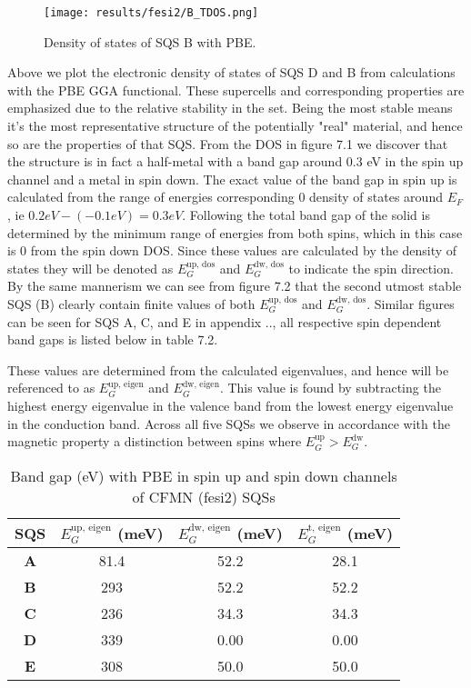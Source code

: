 \begin{figure}[H]
\centering
	\texttt{[image: results/fesi2/B\_TDOS.png]}
	\caption{Density of states of SQS B  with PBE.}
\end{figure}  

Above we plot the electronic density of states of SQS D and B from calculations with the PBE GGA functional. These supercells and corresponding properties are emphasized due to the relative stability in the set. Being the most stable means it's the most representative structure of the potentially "real" material, and hence so are the properties of that SQS. From the DOS in figure 7.1 we discover that the structure is in fact a half-metal with a band gap around 0.3 eV in the spin up channel and a metal in spin down. The exact value of the band gap in spin up is calculated from the range of energies corresponding 0 density of states around $E_F$, ie $ 0.2 eV - (-0.1 eV) = 0.3 eV$. Following the total band gap of the solid is determined by the minimum range of energies from both spins, which in this case is 0 from the spin down DOS. Since these values are calculated by the density of states they will be denoted as $E_G ^\text{up, dos}$ and $E_G ^\text{dw, dos}$ to indicate the spin direction. By the same mannerism we can see from figure 7.2 that the second utmost stable SQS (B) clearly contain finite values of both $E_G ^\text{up, dos}$ and $E_G ^\text{dw, dos}$. Similar figures can be seen for SQS A, C, and E in appendix ..,  all respective spin dependent band gaps is listed below in table 7.2. 

These values are determined from the calculated eigenvalues, and hence will be referenced to as $E_G ^\text{up, eigen}$ and $E_G ^\text{dw, eigen}$. This value is found by subtracting the highest energy eigenvalue in the valence band from the lowest energy eigenvalue in the conduction band. Across all five SQSs we observe in accordance with the magnetic property a distinction between spins where $E_G ^\text{up} > E_G ^\text{dw}$.
 
\begin{table}[H]
\centering
\begin{tabular}{@{}cccc@{}}
\toprule
SQS  & $E_G ^\text{up, eigen}$ (meV) & $E_G ^\text{dw, eigen}$ (meV) & $E_G ^\text{t, eigen}$ (meV)   \\ \midrule
\textbf{A} & 81.4  & 52.2   & 28.1 \\
\textbf{B} & 293  & 52.2    & 52.2 \\
\textbf{C} & 236  & 34.3    & 34.3 \\
\textbf{D} & 339  & 0.00    & 0.00      \\
\textbf{E} & 308  & 50.0    & 50.0 \\ \bottomrule
\end{tabular}
\caption{Band gap (eV) with PBE in spin up and spin down channels of CFMN (fesi2) SQSs}
\end{table}
  
